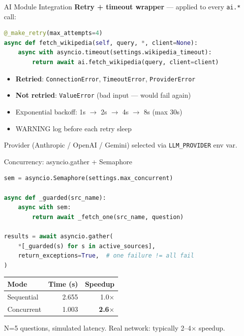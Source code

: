\documentclass[aspectratio=169]{beamer}
\begin{document}
\begin{frame}[fragile]{AI Module Integration}
\textbf{Retry + timeout wrapper} — applied to every \texttt{ai.*} call:

\begin{lstlisting}[language=Python]
@_make_retry(max_attempts=4)
async def fetch_wikipedia(self, query, *, client=None):
    async with asyncio.timeout(settings.wikipedia_timeout):
        return await ai.fetch_wikipedia(query, client=client)
\end{lstlisting}

\vspace{0.5em}
\begin{itemize}
  \item \textbf{Retried}: \texttt{ConnectionError}, \texttt{TimeoutError}, \texttt{ProviderError}
  \item \textbf{Not retried}: \texttt{ValueError} (bad input — would fail again)
  \item Exponential backoff: 1s $\to$ 2s $\to$ 4s $\to$ 8s (max 30s)
  \item WARNING log before each retry sleep
\end{itemize}

\vspace{0.5em}
Provider (Anthropic / OpenAI / Gemini) selected via \texttt{LLM\_PROVIDER} env var.
\end{frame}

\begin{frame}[fragile]{Concurrency: asyncio.gather + Semaphore}
\begin{lstlisting}[language=Python]
sem = asyncio.Semaphore(settings.max_concurrent)

async def _guarded(src_name):
    async with sem:
        return await _fetch_one(src_name, question)

results = await asyncio.gather(
    *[_guarded(s) for s in active_sources],
    return_exceptions=True,  # one failure != all fail
)
\end{lstlisting}

\begin{center}
\begin{tabular}{lrr}
\toprule
Mode & Time (s) & Speedup \\
\midrule
Sequential & 2.655 & 1.0$\times$ \\
Concurrent & 1.003 & \textbf{2.6$\times$} \\
\bottomrule
\end{tabular}
\end{center}
N=5 questions, simulated latency. Real network: typically 2–4$\times$ speedup.
\end{frame}
\end{document}
